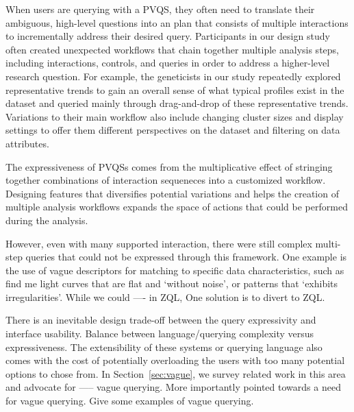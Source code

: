 \par When users are querying with a PVQS, they often need to translate their ambiguous, high-level questions into an plan that consists of multiple interactions to incrementally address their desired query. Participants in our \zv design study often created unexpected workflows that chain together multiple analysis steps, including interactions, controls, and queries in order to address a higher-level research question. For example, the geneticists in our study repeatedly explored representative trends to gain an overall sense of what typical profiles exist in the dataset and queried mainly through drag-and-drop of these representative trends. Variations to their main workflow also include changing cluster sizes and display settings to offer them different perspectives on the dataset and filtering on data attributes. 
\par The expressiveness of PVQSs comes from the multiplicative effect of stringing together combinations of interaction sequeneces into a customized workflow. Designing features that diversifies potential variations and helps the creation of multiple analysis workflows expands the space of actions that could be performed during the analysis. 
\par However, even with many supported interaction, there were still complex multi-step queries that could not be expressed through this framework. One example is the use of vague descriptors for matching to specific data characteristics, such as find me light curves that are flat and `without noise', or patterns that `exhibits irregularities'. While we could ---- in ZQL, 
One solution is to divert to ZQL. 
\par There is an inevitable design trade-off between the query expressivity and interface usability\cite{Morton2014,Jagadish2007}. Balance between language/querying complexity versus expressiveness. The extensibility of these systems or querying language also comes with the cost of potentially overloading the users with too many potential options to chose from. In Section~\ref{sec:vague}, we survey related work in this area and advocate for ----- vague querying. More importantly pointed towards a need for vague querying. Give some examples of vague querying.
